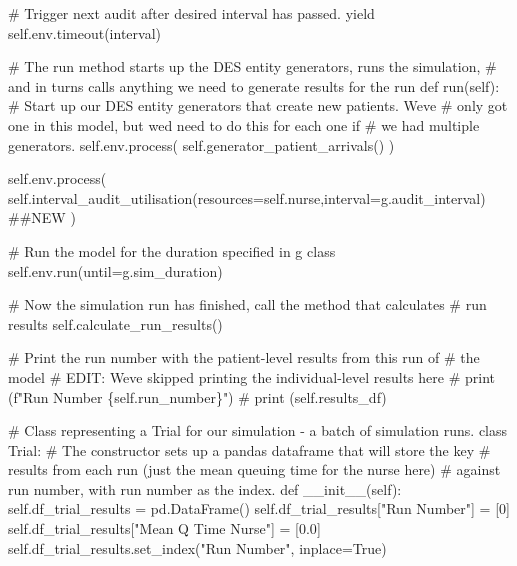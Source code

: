 \documentclass[
  letterpaper,
  DIV=11,
  numbers=noendperiod]{scrreprt}
\newenvironment{Shaded}{}{}
\newcommand{\CommentTok}[1]{\textcolor[rgb]{0.42,0.45,0.49}{#1}}
\newcommand{\ControlFlowTok}[1]{\textcolor[rgb]{0.84,0.23,0.29}{#1}}
\newcommand{\DecValTok}[1]{\textcolor[rgb]{0.00,0.36,0.77}{#1}}
\newcommand{\FloatTok}[1]{\textcolor[rgb]{0.00,0.36,0.77}{#1}}
\newcommand{\FunctionTok}[1]{\textcolor[rgb]{0.44,0.26,0.76}{#1}}
\newcommand{\KeywordTok}[1]{\textcolor[rgb]{0.84,0.23,0.29}{#1}}
\newcommand{\NormalTok}[1]{\textcolor[rgb]{0.14,0.16,0.18}{#1}}
\newcommand{\OperatorTok}[1]{\textcolor[rgb]{0.14,0.16,0.18}{#1}}
\newcommand{\StringTok}[1]{\textcolor[rgb]{0.01,0.18,0.38}{#1}}
\newcommand{\VariableTok}[1]{\textcolor[rgb]{0.89,0.38,0.04}{#1}}
\begin{document}
\begin{tcolorbox}
\begin{Shaded}
\begin{Highlighting}[]
            \CommentTok{\# Trigger next audit after desired interval has passed.}
            \ControlFlowTok{yield} \VariableTok{self}\NormalTok{.env.timeout(interval)}

    \CommentTok{\# The run method starts up the DES entity generators, runs the simulation,}
    \CommentTok{\# and in turns calls anything we need to generate results for the run}
    \KeywordTok{def}\NormalTok{ run(}\VariableTok{self}\NormalTok{):}
        \CommentTok{\# Start up our DES entity generators that create new patients.  We\textquotesingle{}ve}
        \CommentTok{\# only got one in this model, but we\textquotesingle{}d need to do this for each one if}
        \CommentTok{\# we had multiple generators.}
        \VariableTok{self}\NormalTok{.env.process(}
          \VariableTok{self}\NormalTok{.generator\_patient\_arrivals()}
\NormalTok{        )}

        \VariableTok{self}\NormalTok{.env.process(}
          \VariableTok{self}\NormalTok{.interval\_audit\_utilisation(resources}\OperatorTok{=}\VariableTok{self}\NormalTok{.nurse,interval}\OperatorTok{=}\NormalTok{g.audit\_interval) }\CommentTok{\#\#NEW}
\NormalTok{        )}

        \CommentTok{\# Run the model for the duration specified in g class}
        \VariableTok{self}\NormalTok{.env.run(until}\OperatorTok{=}\NormalTok{g.sim\_duration)}

        \CommentTok{\# Now the simulation run has finished, call the method that calculates}
        \CommentTok{\# run results}
        \VariableTok{self}\NormalTok{.calculate\_run\_results()}

        \CommentTok{\# Print the run number with the patient{-}level results from this run of}
        \CommentTok{\# the model}
        \CommentTok{\# EDIT: We\textquotesingle{}ve skipped printing the individual{-}level results here}
        \CommentTok{\# print (f"Run Number \{self.run\_number\}")}
        \CommentTok{\# print (self.results\_df)}


\CommentTok{\# Class representing a Trial for our simulation {-} a batch of simulation runs.}
\KeywordTok{class}\NormalTok{ Trial:}
    \CommentTok{\# The constructor sets up a pandas dataframe that will store the key}
    \CommentTok{\# results from each run (just the mean queuing time for the nurse here)}
    \CommentTok{\# against run number, with run number as the index.}
    \KeywordTok{def}  \FunctionTok{\_\_init\_\_}\NormalTok{(}\VariableTok{self}\NormalTok{):}
        \VariableTok{self}\NormalTok{.df\_trial\_results }\OperatorTok{=}\NormalTok{ pd.DataFrame()}
        \VariableTok{self}\NormalTok{.df\_trial\_results[}\StringTok{"Run Number"}\NormalTok{] }\OperatorTok{=}\NormalTok{ [}\DecValTok{0}\NormalTok{]}
        \VariableTok{self}\NormalTok{.df\_trial\_results[}\StringTok{"Mean Q Time Nurse"}\NormalTok{] }\OperatorTok{=}\NormalTok{ [}\FloatTok{0.0}\NormalTok{]}
        \VariableTok{self}\NormalTok{.df\_trial\_results.set\_index(}\StringTok{"Run Number"}\NormalTok{, inplace}\OperatorTok{=}\VariableTok{True}\NormalTok{)}


\end{Highlighting}
\end{Shaded}
\end{tcolorbox}
\end{document}
